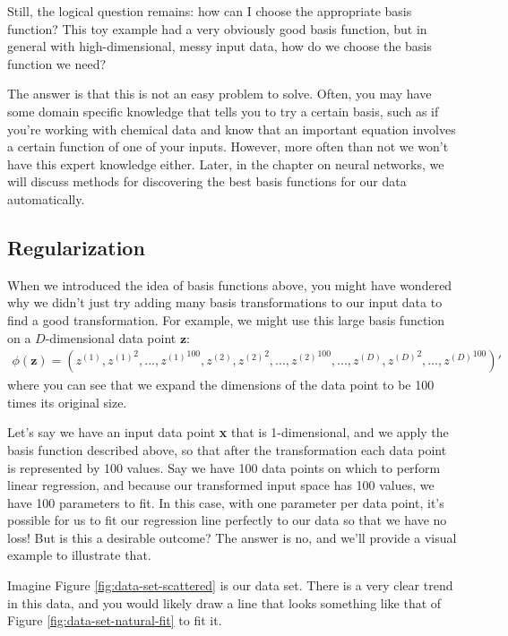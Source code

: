 Still, the logical question remains: how can I choose the appropriate basis function? This toy example had a very obviously good basis function, but in general with high-dimensional, messy input data, how do we choose the basis function we need?

The answer is that this is not an easy problem to solve. Often, you may have some domain specific knowledge that tells you to try a certain basis, such as if you're working with chemical data and know that an important equation involves a certain function of one of your inputs. However, more often than not we won't have this expert knowledge either. Later, in the chapter on neural networks, we will discuss methods for discovering the best basis functions for our data automatically.

\subsection{Regularization}
When we introduced the idea of basis functions above, you might have wondered why we didn't just try adding many basis transformations to our input data to find a good transformation. For example, we might use this large basis function on a $D$-dimensional data point $\textbf{z}$:
\begin{align*}
    \phi(\textbf{z}) = (z^{(1)}, {z^{(1)}}^{2}, ..., {z^{(1)}}^{100}, z^{(2)}, {z^{(2)}}^{2}, ..., {z^{(2)}}^{100}, ..., z^{(D)}, {z^{(D)}}^{2}, ..., {z^{(D)}}^{100})'
\end{align*}
where you can see that we expand the dimensions of the data point to be 100 times its original size.

Let's say we have an input data point \textbf{x} that is 1-dimensional, and we apply the basis function described above, so that after the transformation each data point is represented by 100 values. Say we have 100 data points on which to perform linear regression, and because our transformed input space has 100 values, we have 100 parameters to fit. In this case, with one parameter per data point, it's possible for us to fit our regression line perfectly to our data so that we have no loss! But is this a desirable outcome? The answer is no, and we'll provide a visual example to illustrate that.

Imagine Figure \ref{fig:data-set-scattered} is our data set. There is a very clear trend in this data, and you would likely draw a line that looks something like that of Figure \ref{fig:data-set-natural-fit} to fit it.

